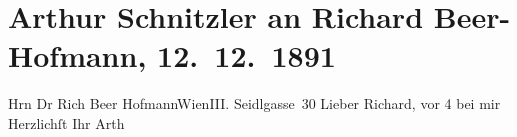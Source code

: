 

         
         \renewcommand{\erwaehntePersonen}{Personen: Richard Beer-Hofmann}
         \renewcommand{\erwaehnteOrte}{Orte: Seidlgasse, Wien}
         \renewcommand{\erwaehnteWerke}{}
               \section[Arthur Schnitzler an Richard Beer-Hofmann, 12. 12. 1891]{ Arthur Schnitzler an Richard Beer-Hofmann, 12. 12. 1891}\nopagebreak{}\rehead{ }\begin{ledgroupsized}[t]{13cm}\normalsize\beginnumbering{} \toendnotes[C]{\smallbreak\pagebreak[2]} 
\toendnotes[C]{\smallbreak}\pstart{}{\pb}Hrn Dr Rich Beer Hofmann\pend{}\pstart{}Wien\pend{}\pstart{}III. Seidlgasse 30\pend{}{\bigskip}\pstart
           \noindent{}{\pb}Lieber Richard,{ }\label{K_L00051-1v}\label{K_L00051-1h} vor 4 bei mir\pend
           \pstart Herzlichſt Ihr \spacefill\mbox{Arth}\pend{}
         
         \endnumbering{}\end{ledgroupsized}  \newcommand{\dateiname}{L00051}\newcommand{\titel}{Arthur Schnitzler an Richard Beer-Hofmann, 12. 12. 1891}\newcommand{\editorInnen}{Martin Anton Müller und Gerd-Hermann Susen}
      